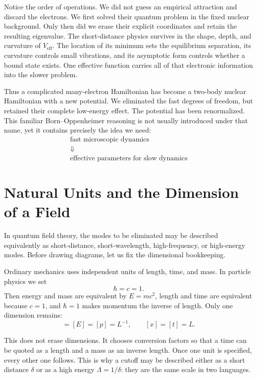 Notice the order of operations. We did not guess an empirical attraction and
discard the electrons. We first solved their quantum problem in the fixed
nuclear background. Only then did we erase their explicit coordinates and
retain the resulting eigenvalue. The short-distance physics survives in the
shape, depth, and curvature of \(V_{\mathrm{eff}}\). The location of its
minimum sets the equilibrium separation, its curvature controls small
vibrations, and its asymptotic form controls whether a bound state exists.
One effective function carries all of that electronic information into the
slower problem.

Thus a complicated many-electron Hamiltonian has become a two-body nuclear
Hamiltonian with a new potential. We eliminated the fast degrees of freedom,
but retained their complete low-energy effect. The potential has been
renormalized. This familiar Born--Oppenheimer reasoning is not usually
introduced under that name, yet it contains precisely the idea we need:
\begin{equation}
\begin{gathered}
\text{fast microscopic dynamics}\\
\Downarrow\\
\text{effective parameters for slow dynamics}
\end{gathered}
\end{equation}

\section{Natural Units and the Dimension of a Field}

In quantum field theory, the modes to be eliminated may be described
equivalently as short-distance, short-wavelength, high-frequency, or
high-energy modes. Before drawing diagrams, let us
fix the dimensional bookkeeping.

Ordinary mechanics uses independent units of length, time, and mass. In
particle physics we set
\begin{equation}
\hbar=c=1.
\end{equation}
Then energy and mass are equivalent by \(E=mc^2\), length and time are
equivalent because \(c=1\), and \(\hbar=1\) makes momentum the inverse of
length. Only one dimension remains:
\begin{equation}
[M]=[E]=[p]=L^{-1},
\qquad
[x]=[t]=L.
\label{eq:natural-units}
\end{equation}

This does not erase dimensions. It chooses conversion factors so that a time
can be quoted as a length and a mass as an inverse length. Once one unit is
specified, every other one follows. This is why a cutoff may be described
either as a short distance \(\delta\) or as a high energy
\(\Lambda=1/\delta\): they are the same scale in two languages.

